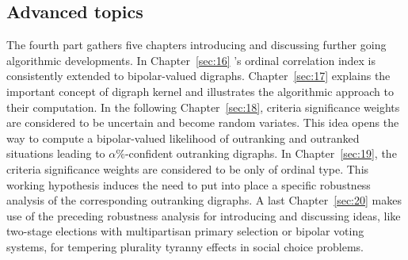 % 
%
%

\begin{partbacktext}
\part{Advanced topics}
\noindent The fourth part gathers five chapters introducing and discussing further going algorithmic developments. In Chapter~\ref{sec:16} \Kendall's ordinal correlation index is consistently extended to bipolar-valued digraphs. Chapter~\ref{sec:17} explains the important concept of digraph kernel and illustrates the \Digraph algorithmic approach to their computation. In the following Chapter~\ref{sec:18}, criteria significance weights are considered to be uncertain and become random variates. This idea opens the way to compute a bipolar-valued likelihood of outranking and outranked situations leading to $\alpha\%$-confident outranking digraphs. In Chapter~\ref{sec:19}, the criteria significance weights are considered to be only of ordinal type. This working hypothesis induces the need to put into place a specific robustness analysis of the corresponding outranking digraphs. A last Chapter~\ref{sec:20} makes use of the preceding robustness analysis for introducing and discussing ideas, like two-stage elections with multipartisan primary selection or bipolar voting systems, for tempering plurality tyranny effects in social choice problems.
\end{partbacktext}